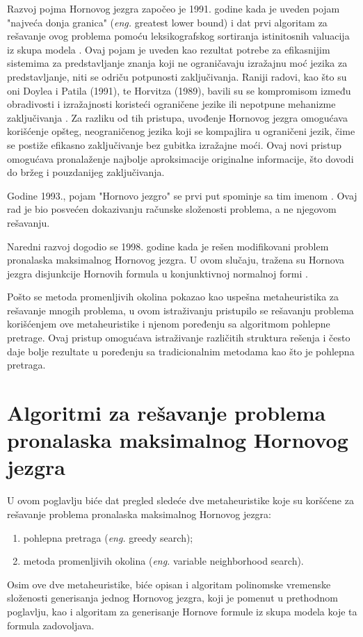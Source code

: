 \documentclass[12pt,oneside]{memoir}
\begin{document}
Razvoj pojma Hornovog jezgra započeo je 1991. godine kada je uveden pojam "najveća donja granica" (\textit{eng.} greatest lower bound) i dat prvi algoritam za rešavanje ovog problema pomoću leksikografskog sortiranja istinitosnih valuacija iz skupa modela \cite{doc2}. Ovaj pojam je uveden kao rezultat potrebe za efikasnijim sistemima za predstavljanje znanja koji ne ograničavaju izražajnu moć jezika za predstavljanje, niti se odriču potpunosti zaključivanja. Raniji radovi, kao što su oni Doylea i Patila (1991), te Horvitza (1989), bavili su se kompromisom između obradivosti i izražajnosti koristeći ograničene jezike ili nepotpune mehanizme zaključivanja \cite{doyle1991, horvitz1989}. Za razliku od tih pristupa, uvođenje Hornovog jezgra omogućava korišćenje opšteg, neograničenog jezika koji se kompajlira u ograničeni jezik, čime se postiže efikasno zaključivanje bez gubitka izražajne moći. Ovaj novi pristup omogućava pronalaženje najbolje aproksimacije originalne informacije, što dovodi do bržeg i pouzdanijeg zaključivanja.

Godine 1993., pojam "Hornovo jezgro" se prvi put spominje sa tim imenom \cite{doc3}. Ovaj rad je bio posvećen dokazivanju računske složenosti problema, a ne njegovom rešavanju.

Naredni razvoj dogodio se 1998. godine kada je rešen modifikovani problem pronalaska maksimalnog Hornovog jezgra. U ovom slučaju, tražena su Hornova jezgra disjunkcije Hornovih formula u konjunktivnoj normalnoj formi \cite{doc1}.

Pošto se metoda promenljivih okolina pokazao kao uspešna metaheuristika za rešavanje mnogih problema, u ovom istraživanju pristupilo se rešavanju problema korišćenjem ove metaheuristike i njenom poređenju sa algoritmom pohlepne pretrage. Ovaj pristup omogućava istraživanje različitih struktura rešenja i često daje bolje rezultate u poređenju sa tradicionalnim metodama kao što je pohlepna pretraga.


\chapter{Algoritmi za rešavanje problema pronalaska maksimalnog Hornovog jezgra}
U ovom poglavlju biće dat pregled sledeće dve metaheuristike koje su koršćene za rešavanje problema pronalaska maksimalnog Hornovog jezgra:
\label{chap:chapter2}

\begin{enumerate}
  \item pohlepna pretraga (\textit{eng.} greedy search);
  \item metoda promenljivih okolina (\textit{eng.} variable neighborhood search).
\end{enumerate}
Osim ove dve metaheuristike, biće opisan i algoritam polinomske vremenske složenosti generisanja jednog Hornovog jezgra, koji je pomenut u prethodnom poglavlju, kao i algoritam za generisanje Hornove formule iz skupa modela koje ta formula zadovoljava.
\end{document}
